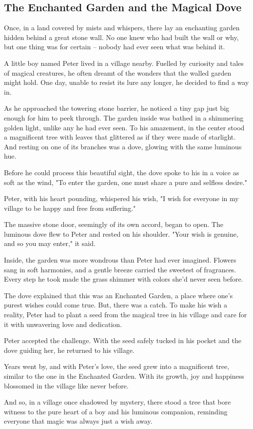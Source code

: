 \documentclass[10pt, letterpaper]{article}
\begin{document}
\subsection*{The Enchanted Garden and the Magical Dove}

Once, in a land covered by mists and whispers, there lay an enchanting garden hidden behind a great stone wall. No one knew who had built the wall or why, but one thing was for certain – nobody had ever seen what was behind it.

A little boy named Peter lived in a village nearby. Fuelled by curiosity and tales of magical creatures, he often dreamt of the wonders that the walled garden might hold. One day, unable to resist its lure any longer, he decided to find a way in.

As he approached the towering stone barrier, he noticed a tiny gap just big enough for him to peek through. The garden inside was bathed in a shimmering golden light, unlike any he had ever seen. To his amazement, in the center stood a magnificent tree with leaves that glittered as if they were made of starlight. And resting on one of its branches was a dove, glowing with the same luminous hue.

Before he could process this beautiful sight, the dove spoke to his in a voice as soft as the wind, "To enter the garden, one must share a pure and selfless desire."

Peter, with his heart pounding, whispered his wish, "I wish for everyone in my village to be happy and free from suffering."

The massive stone door, seemingly of its own accord, began to open. The luminous dove flew to Peter and rested on his shoulder. "Your wish is genuine, and so you may enter," it said.

Inside, the garden was more wondrous than Peter had ever imagined. Flowers sang in soft harmonies, and a gentle breeze carried the sweetest of fragrances. Every step he took made the grass shimmer with colors she'd never seen before.

The dove explained that this was an Enchanted Garden, a place where one’s purest wishes could come true. But, there was a catch. To make his wish a reality, Peter had to plant a seed from the magical tree in his village and care for it with unwavering love and dedication.

Peter accepted the challenge. With the seed safely tucked in his pocket and the dove guiding her, he returned to his village.

Years went by, and with Peter's love, the seed grew into a magnificent tree, similar to the one in the Enchanted Garden. With its growth, joy and happiness blossomed in the village like never before.

And so, in a village once shadowed by mystery, there stood a tree that bore witness to the pure heart of a boy and his luminous companion, reminding everyone that magic was always just a wish away.
\end{document}
